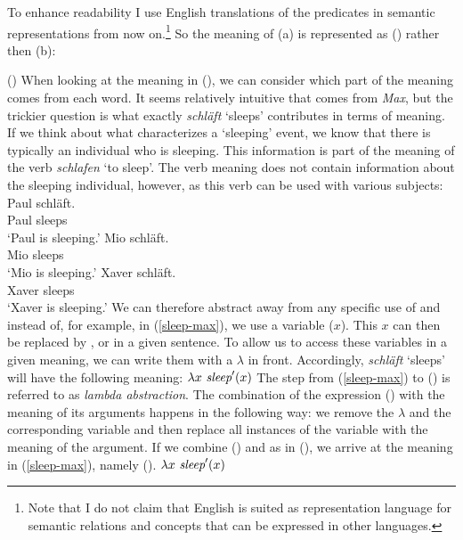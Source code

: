 \noindent
To enhance readability I use English translations of the predicates in semantic representations
from now on.\footnote{%
  Note that I do not claim that English is suited as representation language for semantic relations
  and concepts that can be expressed in other languages.
}
So the meaning of (a) is represented as () rather then (b):

\ea
\label{sleep-max}
()
\z
When looking at the meaning in (), we can consider which part of the meaning comes from each word.
It seems relatively intuitive that  comes from \emph{Max}, but the trickier question is what exactly
\emph{schläft} `sleeps' contributes in terms of meaning. If we think about what characterizes a `sleeping' event, we
know that there is typically an individual who is sleeping. This information is part of the meaning of the verb \emph{schlafen}
`to sleep'. The verb meaning does not contain information about the sleeping individual, however, as this verb can be used
with various subjects:
 \eal
\ex 
\gll Paul schläft.\\
     Paul sleeps\\
\glt `Paul is sleeping.'
\ex 
\gll Mio schläft.\\
     Mio sleeps\\
\glt `Mio is sleeping.'
\ex 
\gll Xaver schläft.\\
     Xaver sleeps\\
\glt `Xaver is sleeping.'
\zl
We can therefore abstract away from any specific use of  and instead of, for example,  in (\ref{sleep-max}), we
use a variable (\eg $x$). This $x$ can then be replaced by ,  or  in a given sentence. To allow us
to access these variables in a given meaning, we can write them with a $\lambda$ in front. Accordingly, \emph{schläft} `sleeps' will have
the following meaning:
\ea
$\lambda x~\textit{sleep}'(x)$
\z
%
The step from (\ref{sleep-max}) to () is referred to as \emph{lambda abstraction}.
The combination of the expression () with the meaning of its arguments happens in the following way: we remove the $\lambda$ and the 
corresponding variable and then replace all instances of the variable with the meaning of the
argument. If we combine () and  as in (),
we arrive at the meaning in (\ref{sleep-max}), namely (). 
\ea
$\lambda x~\textit{sleep}'(x)$ 
